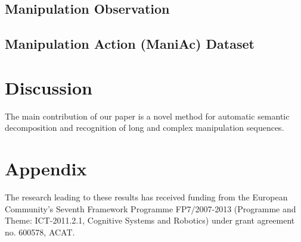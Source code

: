 \subsection{Manipulation Observation}
\label{sec:observation}
 
 
 

\subsection{Manipulation Action (ManiAc) Dataset}
\label{sec:maniacdataset}
 
\section{Discussion}
\label{sec:discussion}

The main contribution of our paper is a novel method for automatic semantic decomposition and recognition of long and complex manipulation sequences.  


\section*{Appendix}
 

\begin{acknowledgements}
The research leading to these results has received funding from the European Community’s Seventh Framework Programme FP7/2007-2013 (Programme and Theme: ICT-2011.2.1, Cognitive Systems and Robotics) under grant agreement no. 600578, ACAT. 
\end{acknowledgements}

 


 



